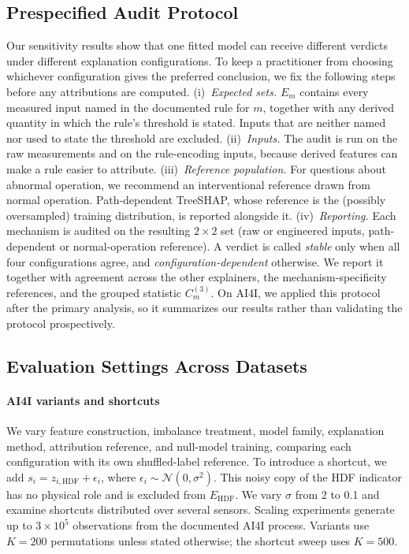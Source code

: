 \documentclass[conference]{IEEEtran}
\begin{document}
\subsection{Prespecified Audit Protocol}
\label{sec:protocol}

Our sensitivity results show that one fitted model can receive different verdicts under different explanation configurations. To keep a practitioner from choosing whichever configuration gives the preferred conclusion, we fix the following steps before any attributions are computed. (i)~\emph{Expected sets.} $E_m$ contains every measured input named in the documented rule for $m$, together with any derived quantity in which the rule's threshold is stated. Inputs that are neither named nor used to state the threshold are excluded. (ii)~\emph{Inputs.} The audit is run on the raw measurements and on the rule-encoding inputs, because derived features can make a rule easier to attribute. (iii)~\emph{Reference population.} For questions about abnormal operation, we recommend an interventional reference drawn from normal operation. Path-dependent TreeSHAP, whose reference is the (possibly oversampled) training distribution, is reported alongside it. (iv)~\emph{Reporting.} Each mechanism is audited on the resulting $2\times2$ set (raw or engineered inputs, path-dependent or normal-operation reference). A verdict is called \emph{stable} only when all four configurations agree, and \emph{configuration-dependent} otherwise. We report it together with agreement across the other explainers, the mechanism-specificity references, and the grouped statistic $C^{(3)}_m$. On AI4I, we applied this protocol after the primary analysis, so it summarizes our results rather than validating the protocol prospectively.

\subsection{Evaluation Settings Across Datasets}
\label{sec:otherdata}

\paragraph{AI4I variants and shortcuts}
We vary feature construction, imbalance treatment, model family, explanation method, attribution reference, and null-model training, comparing each configuration with its own shuffled-label reference. To introduce a shortcut, we add $s_i=z_{i,\mathrm{HDF}}+\epsilon_i$, where $\epsilon_i\sim\mathcal{N}(0,\sigma^2)$. This noisy copy of the HDF indicator has no physical role and is excluded from $E_{\mathrm{HDF}}$. We vary $\sigma$ from 2 to 0.1 and examine shortcuts distributed over several sensors. Scaling experiments generate up to $3\times10^5$ observations from the documented AI4I process. Variants use $K=200$ permutations unless stated otherwise; the shortcut sweep uses $K=500$.
\end{document}
